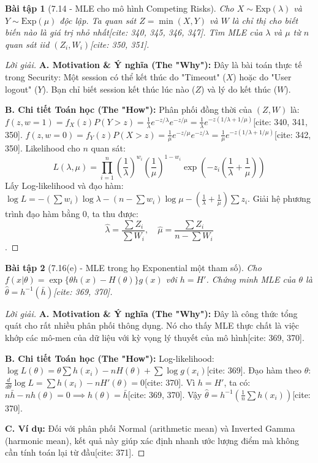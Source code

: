 \documentclass[8pt,a4paper]{article}
\newtheorem{exercise}{Bài tập}
\newenvironment{solution}{\begin{proof}[Lời giải]}{\end{proof}}
\begin{document}
\begin{exercise}[7.14 - MLE cho mô hình Competing Risks]
Cho $X \sim \text{Exp}(\lambda)$ và $Y \sim \text{Exp}(\mu)$ độc lập. Ta quan sát $Z = \min(X, Y)$ và $W$ là chỉ thị cho biết biến nào là giá trị nhỏ nhất[cite: 340, 345, 346, 347]. Tìm MLE của $\lambda$ và $\mu$ từ $n$ quan sát iid $(Z_i, W_i)$[cite: 350, 351].
\end{exercise}

\begin{solution}
\textbf{A. Motivation \& Ý nghĩa (The "Why"):} Đây là bài toán thực tế trong Security: Một session có thể kết thúc do "Timeout" ($X$) hoặc do "User logout" ($Y$). Bạn chỉ biết session kết thúc lúc nào ($Z$) và lý do kết thúc ($W$).

\textbf{B. Chi tiết Toán học (The "How"):}
Phân phối đồng thời của $(Z, W)$ là:
$f(z, w=1) = f_X(z)P(Y>z) = \frac{1}{\lambda}e^{-z/\lambda} e^{-z/\mu} = \frac{1}{\lambda}e^{-z(1/\lambda + 1/\mu)}$[cite: 340, 341, 350].
$f(z, w=0) = f_Y(z)P(X>z) = \frac{1}{\mu}e^{-z/\mu} e^{-z/\lambda} = \frac{1}{\mu}e^{-z(1/\lambda + 1/\mu)}$[cite: 342, 350].
Likelihood cho $n$ quan sát:
\[ L(\lambda, \mu) = \prod_{i=1}^n \left(\frac{1}{\lambda}\right)^{w_i} \left(\frac{1}{\mu}\right)^{1-w_i} \exp\left( -z_i \left(\frac{1}{\lambda} + \frac{1}{\mu}\right) \right) \] 
Lấy Log-likelihood và đạo hàm:
$\log L = -\left(\sum w_i\right) \log \lambda - \left(n - \sum w_i\right) \log \mu - \left(\frac{1}{\lambda} + \frac{1}{\mu}\right) \sum z_i$.
Giải hệ phương trình đạo hàm bằng 0, ta thu được:
\[ \hat{\lambda} = \frac{\sum Z_i}{\sum W_i}, \quad \hat{\mu} = \frac{\sum Z_i}{n - \sum W_i} \].
\end{solution}

\begin{exercise}[7.16(e) - MLE trong họ Exponential một tham số]
Cho $f(x|\theta) = \exp\{\theta h(x) - H(\theta)\}g(x)$ với $h = H'$. Chứng minh MLE của $\theta$ là $\hat{\theta} = h^{-1}(\bar{h})$[cite: 369, 370].
\end{exercise}

\begin{solution}
\textbf{A. Motivation \& Ý nghĩa (The "Why"):} Đây là công thức tổng quát cho rất nhiều phân phối thông dụng. Nó cho thấy MLE thực chất là việc khớp các mô-men của dữ liệu với kỳ vọng lý thuyết của mô hình[cite: 369, 370].

\textbf{B. Chi tiết Toán học (The "How"):}
Log-likelihood: $\log L(\theta) = \theta \sum h(x_i) - n H(\theta) + \sum \log g(x_i)$[cite: 369].
Đạo hàm theo $\theta$: $\frac{d}{d\theta} \log L = \sum h(x_i) - n H'(\theta) = 0$[cite: 370].
Vì $h = H'$, ta có: $n \bar{h} - n h(\theta) = 0 \implies h(\theta) = \bar{h}$[cite: 369, 370].
Vậy $\hat{\theta} = h^{-1}\left( \frac{1}{n} \sum h(x_i) \right)$[cite: 370].

\textbf{C. Ví dụ:} Đối với phân phối Normal (arithmetic mean) và Inverted Gamma (harmonic mean), kết quả này giúp xác định nhanh ước lượng điểm mà không cần tính toán lại từ đầu[cite: 371].
\end{solution}
\end{document}
